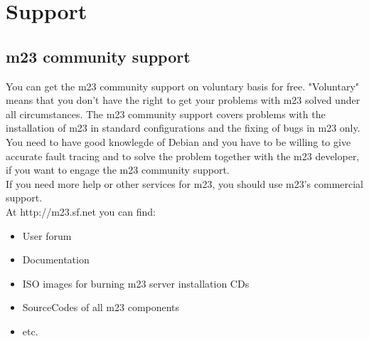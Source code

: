 \section{Support}
\subsection{m23 community support}
You can get the m23 community support on voluntary basis for free. "Voluntary" means that you don't have the right to get your problems with m23 solved under all circumstances. The m23 community support covers problems with the installation of m23 in standard configurations and the fixing of bugs in m23 only.\\

You need to have good knowlegde of Debian and you have to be willing to give accurate fault tracing and to solve the problem together with the m23 developer, if you want to engage the m23 community support.\\

If you need more help or other services for m23, you should use m23's commercial support.\\

At http://m23.sf.net you can find:
\begin{itemize}
\item User forum
\item Documentation
\item ISO images for burning m23 server installation CDs
\item SourceCodes of all m23 components
\item etc.
\end{itemize}



